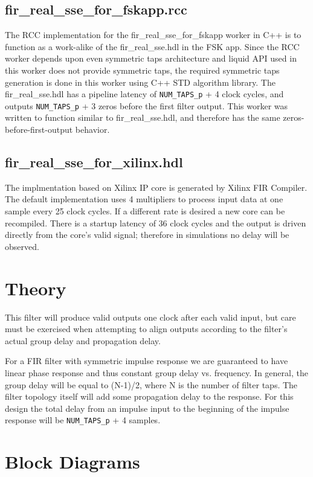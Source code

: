 \documentclass{article}
\begin{document}
\subsection*{fir\_real\_sse\_for\_fskapp.rcc}
The RCC implementation for the fir\_real\_sse\_for\_fskapp worker in C++ is to function as a work-alike of the fir\_real\_sse.hdl in the FSK app. 
Since the RCC worker depends upon even symmetric taps architecture and liquid API used in this worker does not provide symmetric taps,
the required symmetric taps generation is done in this worker using C++ STD algorithm library. 
The fir\_real\_sse.hdl has a pipeline latency of \verb+NUM_TAPS_p+ + 4 clock cycles, and outputs \verb+NUM_TAPS_p+ + 3 zeros before the first filter output. This worker was written to function similar to fir\_real\_sse.hdl, and therefore has the same zeros-before-first-output behavior.

\subsection*{fir\_real\_sse\_for\_xilinx.hdl}
The implmentation based on Xilinx IP core is generated by Xilinx FIR Compiler. The default implementation uses 4 multipliers to process input data at one sample every 25 clock cycles. If a different rate is desired a new core can be recompiled. There is a startup latency of 36 clock cycles and the output is driven directly from the core's valid signal; therefore in simulations no delay will be observed. 

\section*{Theory}
\begin{flushleft}
	This filter will produce valid outputs one clock after each valid input, but care must be exercised when attempting to align outputs according to the filter's actual group delay and propagation delay.\medskip

	For a FIR filter with symmetric impulse response we are guaranteed to have linear phase response and thus constant group delay vs. frequency. In general, the group delay will be equal to (N-1)/2, where N is the number of filter taps.	The filter topology itself will add some propagation delay to the response. For this design the total delay from an impulse input to the beginning of the impulse response will be \verb+NUM_TAPS_p+ + 4 samples.
\end{flushleft}

\section*{Block Diagrams}
\end{document}
